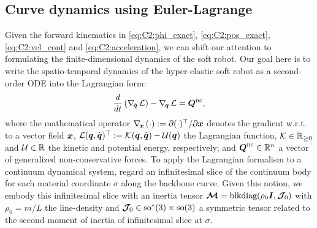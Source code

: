 \subsection{Curve dynamics using Euler-Lagrange}
\noindent Given the forward kinematics in \eqref{eq:C2:phi_exact}, \eqref{eq:C2:pos_exact}, \eqref{eq:C2:vel_cont} and \eqref{eq:C2:acceleration}, we can shift our attention to formulating the finite-dimensional dynamics of the soft robot. Our goal here is to write the spatio-temporal dynamics of the hyper-elastic soft robot as a second-order ODE into the Lagrangian form:
%
%
\begin{equation}
\frac{d}{d t}\left(\nabla_{\!{\dot{\boldsymbol{q}}}}\, \mathcal{L} \right) - \nabla_{\!{\boldsymbol{q}}}\, \mathcal{L} = \boldsymbol{Q}^{\textnormal{nc}}, \label{eq:C2:euler_largrange}
\end{equation}
%
\noindent where the mathematical operator $\nabla_{\!\boldsymbol{x}}\, (\cdot) := \partial(\cdot)^\top/\partial \boldsymbol{x}$ denotes the gradient w.r.t. to a vector field ${\boldsymbol{x}}$, $\mathcal{L}({\boldsymbol{q}},{\dot{\boldsymbol{q}}})^\top := \mathcal{K}({\boldsymbol{q}},{\dot{\boldsymbol{q}}}) - \mathcal{U}({\boldsymbol{q}})$ the Lagrangian function, $\mathcal{K} \in \mathbb{R}_{\ge0}$ and $\mathcal{U}\in \mathbb{R}$ the kinetic and potential energy, respectively; and
$\boldsymbol{Q}^{\textnormal{nc}} \in \mathbb{R}^n$ a vector of generalized non-conservative forces. To apply the Lagrangian formalism to a continuum dynamical system, regard an infinitesimal slice of the continuum body for each material coordinate $\sigma$ along the backbone curve. Given this notion, we embody this infinitesimal slice with an inertia tensor $
\boldsymbol{\mathcal{M}} = \text{blkdiag}(\rho_0 \boldsymbol{I},\boldsymbol{\mathcal{J}}_{\!0})$ with $\rho_0 = m/L$ the line-density and $\boldsymbol{\mathcal{J}}_{\!0} \in \textup{\textrm{so}}^*(3) \times \textup{\textrm{so}}(3)$ a symmetric tensor related to the second moment of inertia of infinitesimal slice at $\sigma$.

